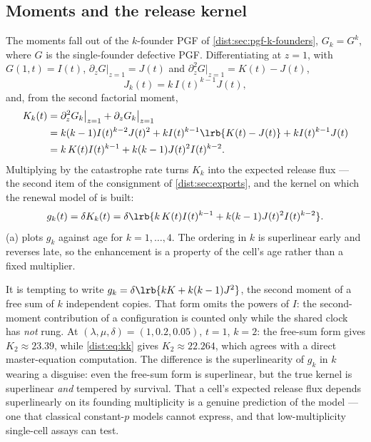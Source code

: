 \subsection{Moments and the release kernel}
\label{dist:sec:moi-moments}

The moments fall out of the $k$-founder PGF of
\cref{dist:sec:pgf-k-founders}, $G_k=G^k$, where $G$ is the single-founder
defective PGF. Differentiating at $z=1$, with $G(1,t)=I(t)$,
$\partial_zG|_{z=1}=J(t)$ and $\partial_z^2G|_{z=1}=K(t)-J(t)$,
\begin{equation}
J_k(t)=k\,I(t)^{k-1}J(t),
\label{dist:eq:jk}
\end{equation}
and, from the second factorial moment,
\begin{align}
K_k(t)&=\partial_z^2G_k\big|_{z=1}+\partial_zG_k\big|_{z=1}\nonumber\\
&=k(k-1)I(t)^{k-2}J(t)^2+kI(t)^{k-1}\lrb{K(t)-J(t)}+kI(t)^{k-1}J(t)\nonumber\\
&=k\,K(t)I(t)^{k-1}+k(k-1)J(t)^2I(t)^{k-2}.
\label{dist:eq:kk}
\end{align}
Multiplying by the catastrophe rate turns $K_k$ into the expected release
flux --- the second item of the consignment of \cref{dist:sec:exports}, and
the kernel on which the renewal model of \ChPop{} is built:
\begin{equation}
g_k(t)=\delta K_k(t)
=\delta\lrb{k\,K(t)I(t)^{k-1}+k(k-1)J(t)^2I(t)^{k-2}}.
\label{dist:eq:gkflux}
\end{equation}
(a) plots $g_k$ against age for $k=1,\ldots,4$. The
ordering in $k$ is superlinear early and reverses late, so the enhancement is
a property of the cell's age rather than a fixed multiplier.

\begin{remark}
\label{dist:rem:gk}
It is tempting to write $g_k=\delta\lrb{kK+k(k-1)J^2}$, the second moment of
a free sum of $k$ independent copies. That form omits the powers of $I$: the
second-moment contribution of a configuration is counted only while the
shared clock has \emph{not} rung. At $(\lambda,\mu,\delta)=(1,0.2,0.05)$,
$t=1$, $k=2$: the free-sum form gives $K_2\approx23.39$, while
\cref{dist:eq:kk} gives $K_2\approx22.264$, which agrees with a direct
master-equation computation. The difference is the superlinearity of $g_k$
in $k$ wearing a disguise: even the free-sum form is superlinear, but the
true kernel is superlinear \emph{and} tempered by survival. That a cell's
expected release flux depends superlinearly on its founding multiplicity is
a genuine prediction of the model --- one that classical constant-$p$ models
cannot express, and that low-multiplicity single-cell assays can test.
\end{remark}

